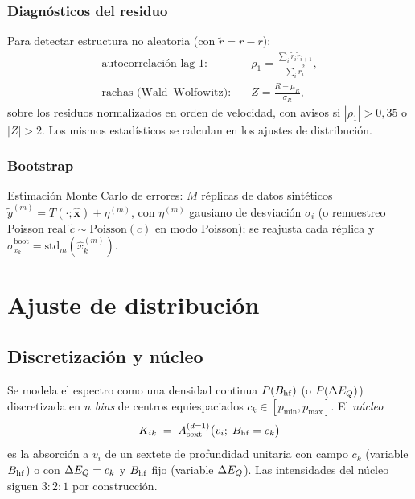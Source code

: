 \subsubsection{Diagnósticos del residuo}
Para detectar estructura no aleatoria (con $\tilde r=r-\bar r$):
\begin{align}
  \text{autocorrelación lag-1:}\quad &\rho_1=\frac{\sum_i\tilde r_i\tilde r_{i+1}}{\sum_i\tilde r_i^2},\\
  \text{rachas (Wald–Wolfowitz):}\quad &Z=\frac{R-\mu_R}{\sigma_R},
\end{align}
sobre los residuos normalizados en orden de velocidad, con avisos si
$|\rho_1|>0{,}35$ o $|Z|>2$. Los mismos estadísticos se calculan en los ajustes de
distribución.

\subsubsection{Bootstrap}
Estimación Monte Carlo de errores: $M$ réplicas de datos sintéticos
$\tilde y^{(m)}=T(\cdot;\hat{\bm x})+\eta^{(m)}$, con $\eta^{(m)}$ gausiano de
desviación $\sigma_i$ (o remuestreo Poisson real
$\tilde c\sim\mathrm{Poisson}(\hat c)$ en modo Poisson); se reajusta cada réplica y
$\hat\sigma_{x_k}^{\text{boot}}=\mathrm{std}_m(\hat x_k^{(m)})$.

\section{Ajuste de distribución}

\subsection{Discretización y núcleo}\label{sec:dist-kernel}

Se modela el espectro como una densidad continua $P(B_{\mathrm{hf}})$ (o $P(\Delta E_{Q})$)
discretizada en $n$ \emph{bins} de centros equiespaciados
$c_k\in[p_{\min},p_{\max}]$. El \emph{núcleo}
\begin{equation}
  K_{ik} \;=\; A_{\text{sext}}^{(d=1)}\bigl(v_i;\;B_{\mathrm{hf}}=c_k\bigr)
\end{equation}
es la absorción a $v_i$ de un sextete de profundidad unitaria con campo $c_k$
(variable $B_{\mathrm{hf}}$) o con $\Delta E_{Q}=c_k$ y $B_{\mathrm{hf}}$ fijo (variable $\Delta E_{Q}$). Las
intensidades del núcleo siguen $3{:}2{:}1$ por construcción.

